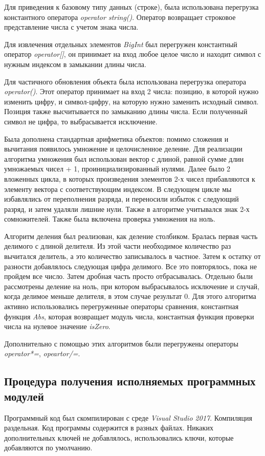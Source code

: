 \documentclass[a4paper,14pt]{article}
\begin{document}
Для приведения к базовому типу данных (строке), была использована перегрузка константного оператора \textit{operator string()}. Оператор возвращает строковое представление числа с учетом знака числа.

Для извлечения отдельных элементов \textit{BigInt} был перегружен константный оператор \textit{operator[]}, он принимает на вход любое целое число и находит символ с нужным индексом в замыкании длины числа.

Для частичного обновления объекта была использована перегрузка оператора \textit{operator()}. Этот оператор принимает на вход 2 числа: позицию, в которой нужно изменить цифру, и символ-цифру, на которую нужно заменить исходный символ. Позиция также высчитывается по замыканию длины числа. Если полученный символ не цифра, то выбрасывается исключение.

Была дополнена стандартная арифметика объектов: помимо сложения и вычитания появилось умножение и целочисленное деление. 
Для реализации алгоритма умножения был использован вектор с длиной, равной сумме длин умножаемых чисел + 1, проинициализированный нулями. Далее было 2 вложенных цикла, в которых произведения элементов 2-х чисел прибавляются к элементу вектора с соответствующим индексом. В следующем цикле мы избавлялись от переполнения разряда, и переносили избыток с следующий разряд, и затем удаляли лишние нули. Также в алгоритме учитывался знак 2-х сомножителей. Также была включена проверка умножения на ноль.

Алгоритм деления был реализован, как деление столбиком. Бралась первая часть делимого с длиной делителя. Из этой части необходимое количество раз вычитался делитель, а это количество записывалось в частное. Затем к остатку от разности добавлялось следующая цифра делимого. Все это повторялось, пока не пройдем все число. Затем дробная часть просто отбрасывалась. Отдельно были рассмотрены деление на ноль, при котором выбрасывалось исключение и случай, когда делимое меньше делителя, в этом случае результат 0. Для этого алгоритма активно использовались перегруженные операторы сравнения, константная функция \textit{Abs}, которая возвращает модуль числа, константная функция проверки числа на нулевое значение \textit{isZero}.

Дополнительно с помощью этих алгоритмов были перегружены операторы \textit{operator*=}, \textit{opeartor/=}.

\subsection{Процедура получения исполняемых программных модулей}
Программный код был скомпилирован с среде \textit{Visual Studio 2017}. Компиляция раздельная. Код программы содержится в разных файлах. Никаких дополнительных ключей не добавлялось, использовались ключи, которые добавляются по умолчанию.
\end{document}
